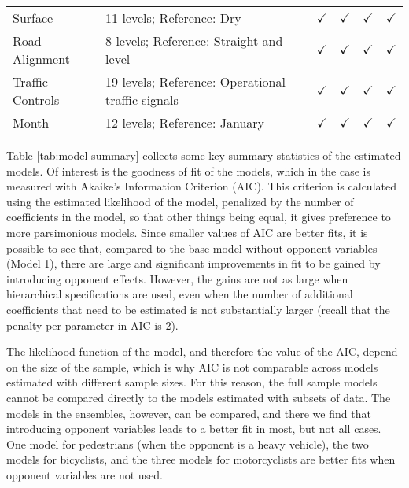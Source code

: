 \documentclass[]{elsarticle} %
\begin{document}
\begin{table}
{\begin{tabular}[t]{llllll}
\hspace{1em}Surface & 11 levels; Reference: Dry & $\checkmark$ & $\checkmark$ & $\checkmark$ & $\checkmark$\\
\rowcolor{gray!6}  \hspace{1em}Road Alignment & 8 levels; Reference: Straight and level & $\checkmark$ & $\checkmark$ & $\checkmark$ & $\checkmark$\\
\hspace{1em}Traffic Controls & 19 levels; Reference: Operational traffic signals & $\checkmark$ & $\checkmark$ & $\checkmark$ & $\checkmark$\\
\rowcolor{gray!6}  \hspace{1em}Month & 12 levels; Reference: January & $\checkmark$ & $\checkmark$ & $\checkmark$ & $\checkmark$\\
\bottomrule
\end{tabular}}
\end{table}

Table \ref{tab:model-summary} collects some key summary statistics of
the estimated models. Of interest is the goodness of fit of the models,
which in the case is measured with Akaike's Information Criterion (AIC).
This criterion is calculated using the estimated likelihood of the
model, penalized by the number of coefficients in the model, so that
other things being equal, it gives preference to more parsimonious
models. Since smaller values of AIC are better fits, it is possible to
see that, compared to the base model without opponent variables (Model
1), there are large and significant improvements in fit to be gained by
introducing opponent effects. However, the gains are not as large when
hierarchical specifications are used, even when the number of additional
coefficients that need to be estimated is not substantially larger
(recall that the penalty per parameter in AIC is 2).

The likelihood function of the model, and therefore the value of the
AIC, depend on the size of the sample, which is why AIC is not
comparable across models estimated with different sample sizes. For this
reason, the full sample models cannot be compared directly to the models
estimated with subsets of data. The models in the ensembles, however,
can be compared, and there we find that introducing opponent variables
leads to a better fit in most, but not all cases. One model for
pedestrians (when the opponent is a heavy vehicle), the two models for
bicyclists, and the three models for motorcyclists are better fits when
opponent variables are not used.
\end{document}

